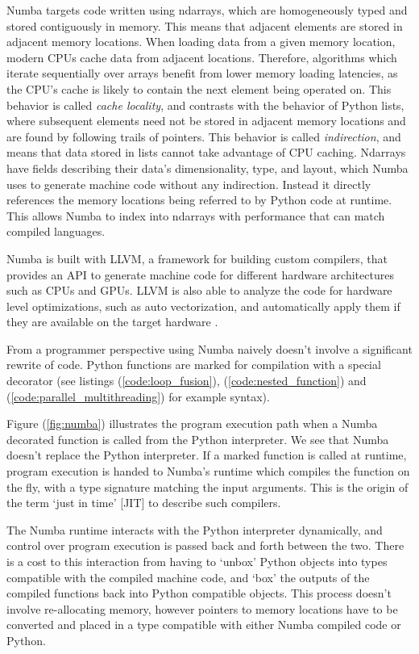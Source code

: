 \documentclass{IEEEcsmag}
\begin{document}
Numba targets code written using ndarrays, which are homogeneously typed and stored contiguously in memory. This means that adjacent elements are stored in adjacent memory locations. When loading data from a given memory location, modern CPUs cache data from adjacent locations. Therefore, algorithms which iterate sequentially over arrays benefit from lower memory loading latencies, as the CPU's cache is likely to contain the next element being operated on. This behavior is called \textit{cache locality}, and contrasts with the behavior of Python lists, where subsequent elements need not be stored in adjacent memory locations and are found by following trails of pointers. This behavior is called \textit{indirection}, and means that data stored in lists cannot take advantage of CPU caching. Ndarrays have fields describing their data's dimensionality, type, and layout, which Numba uses to generate machine code without any indirection. Instead it directly references the memory locations being referred to by Python code at runtime. This allows Numba to index into ndarrays with performance that can match compiled languages.

Numba is built with LLVM, a framework for building custom compilers, that provides an API to generate machine code for different hardware architectures such as CPUs and GPUs. LLVM is also able to analyze the code for hardware level optimizations, such as auto vectorization, and automatically apply them if they are available on the target hardware \cite{Lattner2004}.

From a programmer perspective using Numba naively doesn't involve a significant rewrite of code. Python functions are marked for compilation with a special decorator (see listings (\ref{code:loop_fusion}), (\ref{code:nested_function}) and (\ref{code:parallel_multithreading}) for example syntax). 

Figure (\ref{fig:numba}) illustrates the program execution path when a Numba decorated function is called from the Python interpreter. We see that Numba doesn't replace the Python interpreter. If a marked function is called at runtime, program execution is handed to Numba's runtime which compiles the function on the fly, with a type signature matching the input arguments. This is the origin of the term `just in time' [JIT] to describe such compilers. 

The Numba runtime interacts with the Python interpreter dynamically, and control over program execution is passed back and forth between the two. There is a cost to this interaction from having to `unbox' Python objects into types compatible with the compiled machine code, and `box' the outputs of the compiled functions back into Python compatible objects. This process doesn't involve re-allocating memory, however pointers to memory locations have to be converted and placed in a type compatible with either Numba compiled code or Python. 
\end{document}
